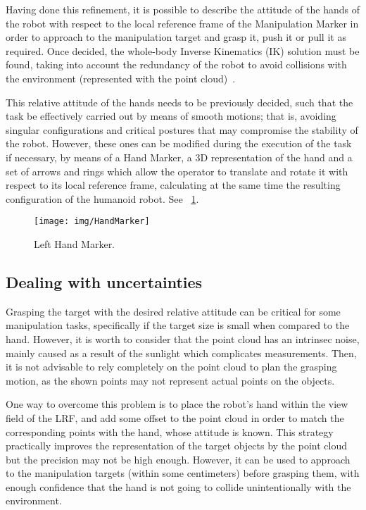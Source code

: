 		Having done this refinement, it is possible to describe the attitude of the hands of the robot with respect
		to the local reference frame of the Manipulation Marker in order to approach to the manipulation target and
		grasp it, push it or pull it as required.
		Once decided, the whole-body Inverse Kinematics (IK) solution must be found, taking into account the redundancy
		of the robot to avoid collisions with the environment (represented with the point cloud)~\cite{Kanoun}.
		
		This relative attitude of the hands needs to be previously decided, such that the task be effectively carried
		out by means of smooth motions; that is, avoiding singular configurations and critical postures that may
		compromise the stability of the robot.
		However, these ones can be modified during the execution of the task if necessary, by means of a Hand Marker,
		a 3D representation of the hand and a set of arrows and rings which allow the operator to translate and rotate it
		with respect to its local reference frame, calculating at the same time the resulting configuration of the
		humanoid robot.
		See \figurename~\ref{fig:HandMarker}.
		
		\begin{figure}[b]
			\centering
			\texttt{[image: img/HandMarker]}
			\caption{Left Hand Marker.}
			\label{fig:HandMarker}
		\end{figure}
		
	\subsection{Dealing with uncertainties}
		
		Grasping the target with the desired relative attitude can be critical for some manipulation tasks,
		specifically if the target size is small when compared to the hand.
		However, it is worth to consider that the point cloud has an intrinsec noise, mainly caused as a result of the
		sunlight which complicates measurements.
		Then, it is not advisable to rely completely on the point cloud to plan the grasping motion,
		as the shown points may not represent actual points on the objects.
		
		One way to overcome this problem is to place the robot's hand within the view field of the LRF,
		and add some offset to the point cloud in order to match the corresponding points with the hand,
		whose attitude is known.
		This strategy practically improves the representation of the target objects by the point cloud but
		the precision may not be high enough.
		However, it can be used to approach to the manipulation targets (within some centimeters) before grasping them,
		with enough confidence that the hand is not going to collide unintentionally with the environment.
		
